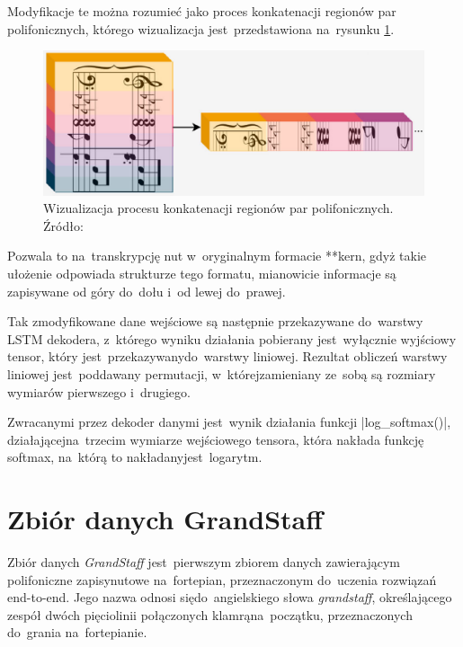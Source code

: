 Modyfikacje te można rozumieć jako proces konkatenacji regionów par polifonicznych, którego wizualizacja jest~przedstawiona na~rysunku \ref{fig:rowijanie-nut}.


\begin{figure}[h]
	\centering
	\includegraphics[width=12cm]{images/rozwijanie-nut.png}
	\caption{Wizualizacja procesu konkatenacji regionów par polifonicznych. Źródło: \cite{Rios-Vila2023}}
	\label{fig:rowijanie-nut}
\end{figure}


Pozwala to na~transkrypcję nut w~oryginalnym formacie **kern, gdyż takie ułożenie odpowiada strukturze tego formatu, mianowicie informacje są zapisywane od góry do~dołu i~od lewej do~prawej.

Tak zmodyfikowane dane wejściowe są następnie przekazywane do~warstwy LSTM dekodera, z~którego wyniku działania pobierany jest~wyłącznie wyjściowy tensor, który jest~przekazywany\linebreak do~warstwy liniowej. Rezultat obliczeń warstwy liniowej jest~poddawany permutacji, w~której\linebreak zamieniany ze~sobą są rozmiary wymiarów pierwszego i~drugiego.

Zwracanymi przez dekoder danymi jest~wynik działania funkcji \pyth|log_softmax()|, działającej\linebreak na~trzecim wymiarze wejściowego tensora, która nakłada funkcję softmax, na~którą to nakładany\linebreak jest~logarytm.

\section{Zbiór danych GrandStaff}

Zbiór danych \textit{GrandStaff} jest~pierwszym zbiorem danych zawierającym polifoniczne zapisy\linebreak nutowe na~fortepian, przeznaczonym do~uczenia rozwiązań end-to-end. Jego nazwa odnosi się\linebreak do~angielskiego słowa \textit{grandstaff}, określającego zespół dwóch pięciolinii połączonych klamrą\linebreak na~początku, przeznaczonych do~grania na~fortepianie.

